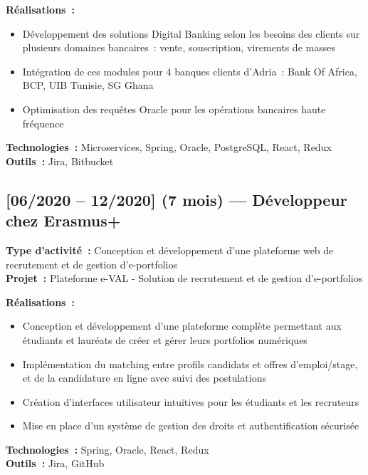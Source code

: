 \textbf{Réalisations~:}
\begin{itemize}
    \item Développement des solutions Digital Banking selon les besoins des clients sur plusieurs domaines bancaires~: vente, souscription, virements de masses
    \item Intégration de ces modules pour 4 banques clients d'Adria~: Bank Of Africa, BCP, UIB Tunisie, SG Ghana
    \item Optimisation des requêtes Oracle pour les opérations bancaires haute fréquence
\end{itemize}
\textbf{Technologies~:} Microservices, Spring, Oracle, PostgreSQL, React, Redux\\
\textbf{Outils~:} Jira, Bitbucket

\subsection*{[06/2020 -- 12/2020] (7 mois) --- Développeur chez Erasmus+}
\vspace{4pt}
\textbf{Type d'activité~:} Conception et développement d'une plateforme web de recrutement et de gestion d'e-portfolios\\
\textbf{Projet~:} Plateforme e-VAL - Solution de recrutement et de gestion d'e-portfolios

\textbf{Réalisations~:}
\begin{itemize}
    \item Conception et développement d'une plateforme complète permettant aux étudiants et lauréats de créer et gérer leurs portfolios numériques
    \item Implémentation du matching entre profils candidats et offres d'emploi/stage, et de la candidature en ligne avec suivi des postulations
    \item Création d'interfaces utilisateur intuitives pour les étudiants et les recruteurs
    \item Mise en place d'un système de gestion des droits et authentification sécurisée
\end{itemize}
\textbf{Technologies~:} Spring, Oracle, React, Redux\\
\textbf{Outils~:} Jira, GitHub
